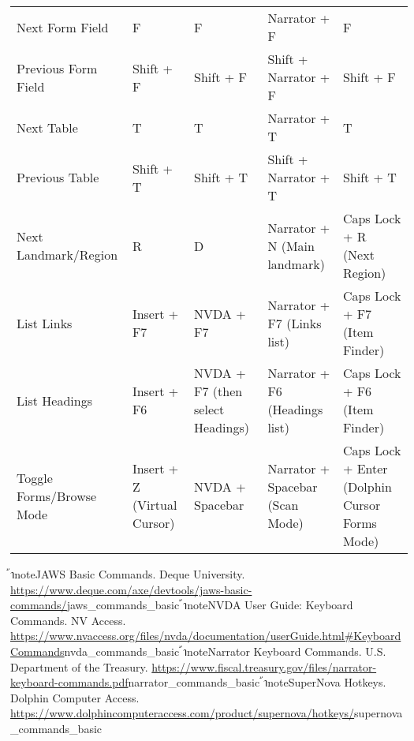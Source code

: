 \begin{tabular}{|l|l|l|l|l|}
Next Form Field & F & F & Narrator + F & F \\
Previous Form Field & Shift + F & Shift + F & Shift + Narrator + F & Shift + F \\
Next Table & T & T & Narrator + T & T \\
Previous Table & Shift + T & Shift + T & Shift + Narrator + T & Shift + T \\
Next Landmark/Region & R & D & Narrator + N (Main landmark) & Caps Lock + R (Next Region) \\
List Links & Insert + F7 & NVDA + F7 & Narrator + F7 (Links list) & Caps Lock + F7 (Item Finder) \\
List Headings & Insert + F6 & NVDA + F7 (then select Headings) & Narrator + F6 (Headings list) & Caps Lock + F6 (Item Finder) \\
Toggle Forms/Browse Mode & Insert + Z (Virtual Cursor) & NVDA + Spacebar & Narrator + Spacebar (Scan Mode) & Caps Lock + Enter (Dolphin Cursor Forms Mode) \\ \hline
\end{tabular}
้าnote{JAWS Basic Commands. Deque University. \url{https://www.deque.com/axe/devtools/jaws-basic-commands/}}{jaws_commands_basic}
้าnote{NVDA User Guide: Keyboard Commands. NV Access. \url{https://www.nvaccess.org/files/nvda/documentation/userGuide.html#KeyboardCommands}}{nvda_commands_basic}
้าnote{Narrator Keyboard Commands. U.S. Department of the Treasury. \url{https://www.fiscal.treasury.gov/files/narrator-keyboard-commands.pdf}}{narrator_commands_basic}
้าnote{SuperNova Hotkeys. Dolphin Computer Access. \url{https://www.dolphincomputeraccess.com/product/supernova/hotkeys/}}{supernova_commands_basic}
